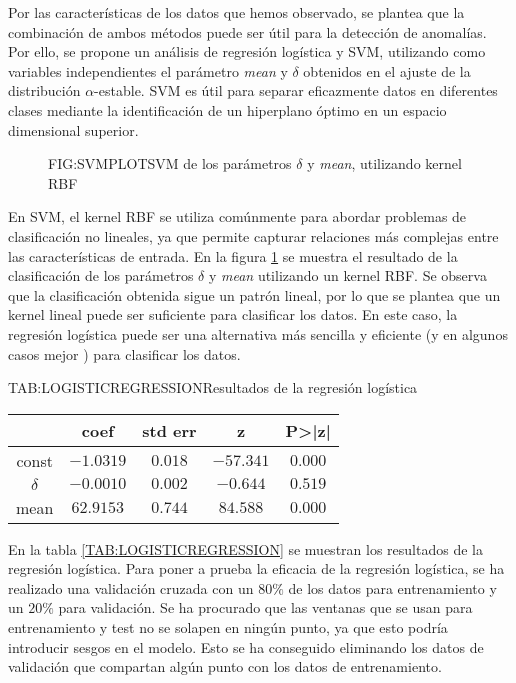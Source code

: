 Por las características de los datos que hemos observado, se plantea que la combinación de ambos métodos puede ser útil para la detección de anomalías.
Por ello, se propone un análisis de regresión logística y \ac{SVM}, utilizando como variables independientes el parámetro \textit{mean} y $\delta$ obtenidos en el ajuste de la distribución $\alpha$-estable. SVM es útil para separar eficazmente datos en diferentes clases mediante la identificación de un hiperplano óptimo en un espacio dimensional superior.

\begin{figure}[SVM de los parámetros $\delta$ y \textit{mean}, utilizando kernel RBF]{FIG:SVMPLOT}{SVM de los parámetros $\delta$ y \textit{mean}, utilizando kernel RBF}
    \label{FIG:SVMPLOT}
\end{figure}

En SVM, el kernel RBF se utiliza comúnmente para abordar problemas de clasificación no lineales, ya que permite capturar relaciones más complejas entre las características de entrada. En la figura \ref{FIG:SVMPLOT} se muestra el resultado de la clasificación de los parámetros $\delta$ y \textit{mean} utilizando un kernel RBF. Se observa que la clasificación obtenida sigue un patrón lineal, por lo que se plantea que un kernel lineal puede ser suficiente para clasificar los datos. En este caso, la regresión logística puede ser una alternativa más sencilla y eficiente (y en algunos casos mejor \cite{salazar2012comparison}) para clasificar los datos.

\begin{table}[Resultados de la regresión logística]{TAB:LOGISTICREGRESSION}{Resultados de la regresión logística}
    \begin{tabular}{|c|c|c|c|c|}
        \hline
        & coef & std err & z & P>|z| \\
        \hline
        const & $-1.0319$ & $0.018$ & $-57.341$ & $0.000$ \\
        $\delta$ & $-0.0010$ & $0.002$ & $-0.644$ & $0.519$ \\
        mean & $62.9153$ & $0.744$ & $84.588$ & $0.000$ \\
        \hline
    \end{tabular}
\end{table}

En la tabla \ref{TAB:LOGISTICREGRESSION} se muestran los resultados de la regresión logística. Para poner a prueba la eficacia de la regresión logística, se ha realizado una validación cruzada con un $80\%$ de los datos para entrenamiento y un $20\%$ para validación. Se ha procurado que las ventanas que se usan para entrenamiento y test no se solapen en ningún punto, ya que esto podría introducir sesgos en el modelo. Esto se ha conseguido eliminando los datos de validación que compartan algún punto con los datos de entrenamiento. 

